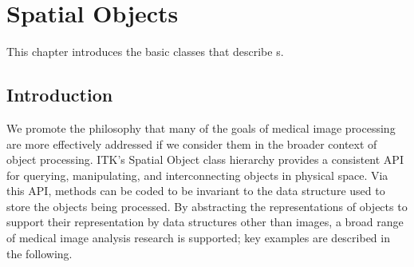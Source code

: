 
\chapter{Spatial Objects}%
\label{sec:SpatialObjects}

This chapter introduces the basic classes that describe
s.

\section{Introduction}%
\label{Introduction}

We promote the philosophy that many of the goals of medical image processing
are more effectively addressed if we consider them in the broader context
of object processing. ITK's Spatial Object class hierarchy provides a
consistent API for querying, manipulating, and interconnecting objects in
physical space.   Via this API, methods can be coded to be invariant to
the data structure used to store the objects being processed.   By
abstracting the representations of objects to support their representation
by data structures other than images, a broad range of medical image
analysis research is supported; key examples are described in the following.

